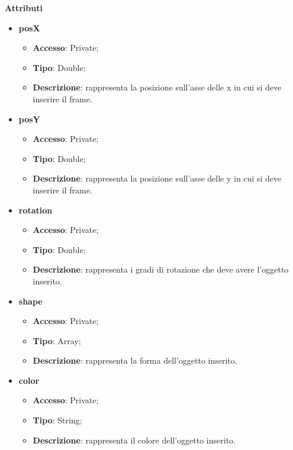 {{{	\textbf{Attributi}
	\begin{itemize}
		\item \textbf{posX}
		\begin{itemize}
			\item \textbf{Accesso}: Private;
			\item \textbf{Tipo}: Double;
			\item \textbf{Descrizione}: rappresenta la posizione sull’asse delle x in cui si deve inserire il frame.
		\end{itemize}
		\item \textbf{posY}
		\begin{itemize}
			\item \textbf{Accesso}: Private;
			\item \textbf{Tipo}: Double;
			\item \textbf{Descrizione}: rappresenta la posizione sull’asse delle y in cui si deve inserire il frame.
		\end{itemize}
		\item \textbf{rotation}
		\begin{itemize}
			\item \textbf{Accesso}: Private;
			\item \textbf{Tipo}: Double;
			\item \textbf{Descrizione}: rappresenta i gradi di rotazione che deve avere l’oggetto inserito.
		\end{itemize}
		\item \textbf{shape}
		\begin{itemize}
			\item \textbf{Accesso}: Private;
			\item \textbf{Tipo}: Array;
			\item \textbf{Descrizione}: rappresenta la forma dell’oggetto inserito.
		\end{itemize}
		\item \textbf{color}
		\begin{itemize}
			\item \textbf{Accesso}: Private;
			\item \textbf{Tipo}: String;
			\item \textbf{Descrizione}: rappresenta il colore dell’oggetto inserito.
		\end{itemize}
	\end{itemize}
	
}}}
